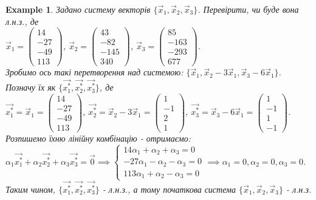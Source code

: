 \documentclass[a4paper, 10pt]{article}
\theoremstyle{theoremdd}
\theoremstyle{theoremdd}
\theoremstyle{theoremdd}
\theoremstyle{theoremdd}
\newtheorem{example}[theorem]{Example}
\theoremstyle{theoremdd}
\theoremstyle{theoremdd}
\theoremstyle{theoremdd}
\theoremstyle{theoremdd}
\begin{document}
	\begin{example}
	Задано систему векторів $\{\vec{x}_1,\vec{x}_2,\vec{x}_3\}$. Перевірити, чи буде вона л.н.з., де \\ $\vec{x}_1 = \begin{pmatrix}
	14 \\ -27 \\ -49 \\ 113
	\end{pmatrix}$, $\vec{x}_2 = \begin{pmatrix}
	43 \\ -82 \\ -145 \\ 340
	\end{pmatrix}$, $\vec{x}_3 = \begin{pmatrix}
	85 \\ -163 \\ -293 \\ 677
	\end{pmatrix}$.\\
	Зробимо ось такі перетворення над системою: $\{\vec{x}_1, \vec{x}_2 - 3 \vec{x}_1, \vec{x}_3 - 6\vec{x}_1 \}$. Позначу їх як $\{\vec{x^*_1},\vec{x^*_2},\vec{x^*_3}\}$, де\\
	$\vec{x^*_1} = \vec{x}_1 = \begin{pmatrix}
	14 \\ -27 \\ -49 \\ 113
	\end{pmatrix}$, $\vec{x^*_2} = \vec{x}_2 - 3\vec{x}_1 = \begin{pmatrix}
	1 \\ -1 \\ 2 \\ 1
	\end{pmatrix}$, $\vec{x^*_3} = \vec{x}_3 - 6\vec{x}_1 = \begin{pmatrix}
	1 \\ -1 \\ 1 \\ -1
	\end{pmatrix}$.\\
	Розпишемо їхню лінійну комбінацію - отримаємо:\\
	$\alpha_1 \vec{x^*_1} + \alpha_2 \vec{x^*_2} + \alpha_3 \vec{x^*_3} = \vec{0} \implies \begin{cases} 14 \alpha_1 + \alpha_2 + \alpha_3 = 0 \\
					   -27 \alpha_1 - \alpha_2 - \alpha_3 = 0 \\
					   113 \alpha_1 + \alpha_2 - \alpha_3 = 0
	\end{cases} \implies \alpha_1 = 0, \alpha_2 = 0, \alpha_3 = 0$.\\
	Таким чином, $\{\vec{x^*_1}, \vec{x^*_2}, \vec{x^*_3}\}$ - л.н.з., а тому початкова система $\{\vec{x}_1,\vec{x}_2,\vec{x}_3\}$ - л.н.з.
	\end{example}
	
\end{document}
